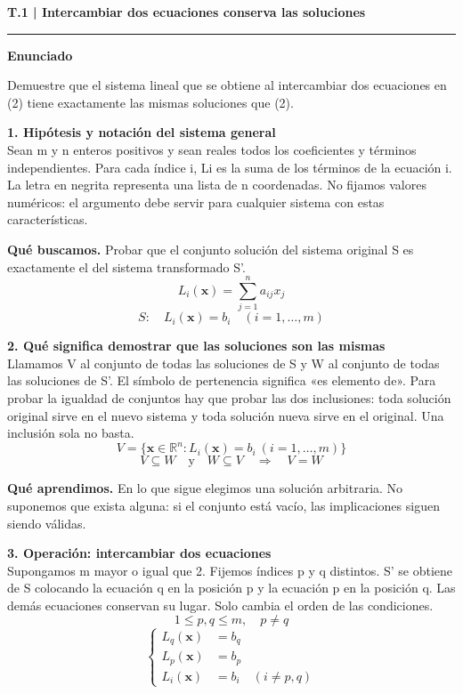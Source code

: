 \documentclass[11pt,a4paper,landscape]{article}
\newcommand{\titulo}[1]{{\LARGE\bfseries #1}\par\smallskip\hrule\medskip}
\begin{document}
\newpage{}\hypertarget{1.1-T.1}{}
\titulo{T.1 | Intercambiar dos ecuaciones conserva las soluciones}
\textbf{Enunciado}\par Demuestre que el sistema lineal que se obtiene al intercambiar dos ecuaciones en (2) tiene exactamente las mismas soluciones que (2).
\par\medskip\large
\noindent\begin{minipage}{\linewidth}\textbf{1. Hipótesis y notación del sistema general}\\[2pt]Sean m y n enteros positivos y sean reales todos los coeficientes y términos independientes. Para cada índice i, Li es la suma de los términos de la ecuación i. La letra en negrita representa una lista de n coordenadas. No fijamos valores numéricos: el argumento debe servir para cualquier sistema con estas características.
\par\smallskip\textbf{Qué buscamos.} Probar que el conjunto solución del sistema original S es exactamente el del sistema transformado S'.
\[L_i(\mathbf{x})=\sum_{j=1}^{n}a_{ij}x_j\]
\[S:\quad L_i(\mathbf{x})=b_i\quad (i=1,\ldots,m)\]
\end{minipage}\par\medskip
\noindent\begin{minipage}{\linewidth}\textbf{2. Qué significa demostrar que las soluciones son las mismas}\\[2pt]Llamamos V al conjunto de todas las soluciones de S y W al conjunto de todas las soluciones de S'. El símbolo de pertenencia significa «es elemento de». Para probar la igualdad de conjuntos hay que probar las dos inclusiones: toda solución original sirve en el nuevo sistema y toda solución nueva sirve en el original. Una inclusión sola no basta.
\[V=\{\mathbf{x}\in\mathbb{R}^{n}:L_i(\mathbf{x})=b_i\ (i=1,\ldots,m)\}\]
\[V\subseteq W\quad\mathrm{y}\quad W\subseteq V\quad\Longrightarrow\quad V=W\]
\par\smallskip\textbf{Qué aprendimos.} En lo que sigue elegimos una solución arbitraria. No suponemos que exista alguna: si el conjunto está vacío, las implicaciones siguen siendo válidas.
\end{minipage}\par\medskip
\noindent\begin{minipage}{\linewidth}\textbf{3. Operación: intercambiar dos ecuaciones}\\[2pt]Supongamos m mayor o igual que 2. Fijemos índices p y q distintos. S' se obtiene de S colocando la ecuación q en la posición p y la ecuación p en la posición q. Las demás ecuaciones conservan su lugar. Solo cambia el orden de las condiciones.
\[1\leq p,q\leq m,\quad p\ne q\]
\[\left\{\begin{aligned}L_q(\mathbf{x})&=b_q\\L_p(\mathbf{x})&=b_p\\L_i(\mathbf{x})&=b_i\quad(i\ne p,q)\end{aligned}\right.\]
\end{minipage}\par\medskip
\end{document}
